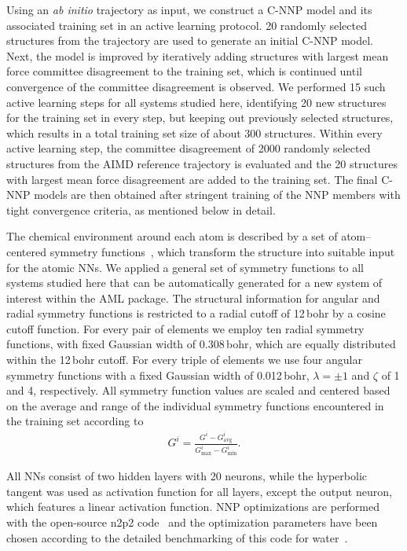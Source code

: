 \documentclass[aip,jcp,amsmath,amssymb,floatfix,reprint,citeautoscript,noeprint]{revtex4-1}
\begin{document}
\begin{bibunit}
%
Using an \textit{ab initio} trajectory as input, we construct
a C-NNP model and its associated training set in an
active learning protocol.
%
20 randomly selected structures from the trajectory are used
to generate an initial C-NNP model.
%
Next, the model is improved by iteratively adding
structures with largest mean force committee disagreement to
the training set, which is continued until
convergence of the committee disagreement is observed.
%
We performed 15 such active learning steps for all
systems studied here, identifying 20 new structures
for the training set in every step, but keeping out previously
selected structures, which results in a
total training set size of about 300 structures.
%
Within every active learning step, the committee disagreement
of 2000 randomly selected structures from the AIMD reference
trajectory is evaluated and the 20 structures with largest
mean force disagreement are added to the training set.
%
The final C-NNP models are then obtained
after stringent training of the NNP members with
tight convergence criteria, as mentioned below in detail.

%
The chemical environment around each atom
is described by a set of atom--centered symmetry functions~\cite{Behler2011/10.1063/1.3553717},
which transform the structure into suitable
input for the atomic NNs.
%
We applied a general set of symmetry functions
to all systems studied here that can
be automatically generated for a new system of interest
within the AML package.
%
The structural information for angular and radial
symmetry functions is restricted to a
radial cutoff of 12\,bohr by a cosine cutoff function.
%
For every pair of elements we employ ten radial symmetry functions,
with fixed Gaussian width of 0.308\,bohr, which are equally distributed
within the 12\,bohr cutoff.
%
For every triple of elements we use four angular symmetry functions
with a fixed Gaussian width of 0.012\,bohr, $\lambda=\pm 1$ and
$\zeta$ of 1 and 4, respectively.
%
All symmetry function values are
scaled and centered based on the average
and range of the individual symmetry functions
encountered in the training set according to
\begin{align}
    G^{i} =  \frac{G^i - G^i_\text{avg}}{G^i_\text{max}-G^i_\text{min}}.
\end{align}

%
All NNs consist of two hidden layers with 20 neurons, while
the hyperbolic tangent was used as activation function
for all layers, except the output neuron, which features a
linear activation function.
%
NNP optimizations are performed with the open-source n2p2
code~\cite{Singraber2019/10.1021/acs.jctc.8b01092}
and the optimization parameters have
been chosen according to the detailed benchmarking
of this code for water~\cite{Singraber2019/10.1021/acs.jctc.8b01092}.
%



\end{bibunit}
\end{document}
